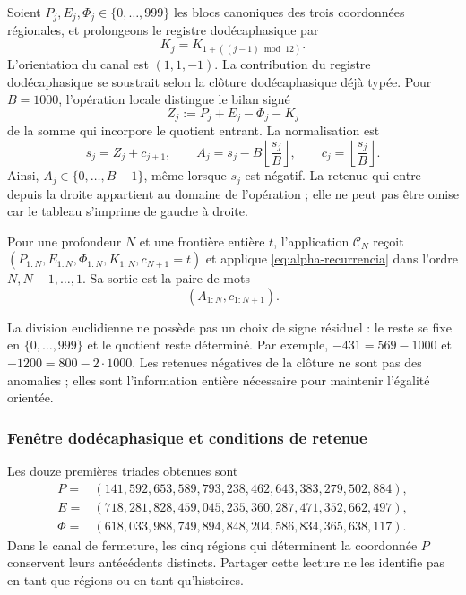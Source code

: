 Soient \(P_j,E_j,\Phi_j\in\{0,\ldots,999\}\) les blocs canoniques des
trois coordonnées régionales, et prolongeons le registre dodécaphasique par
\[
 K_j=K_{1+((j-1)\bmod12)}.
\]
L'orientation du canal est \((1,1,-1)\). La contribution du registre dodécaphasique se soustrait selon la clôture dodécaphasique déjà typée. Pour \(B=1000\), l'opération locale distingue le bilan signé
\[
 Z_j:=P_j+E_j-\Phi_j-K_j
\]
de la somme qui incorpore le quotient entrant. La normalisation est
\begin{equation}
 s_j=Z_j+c_{j+1},\qquad
 A_j=s_j-B\left\lfloor\frac{s_j}{B}\right\rfloor,
 \qquad c_j=\left\lfloor\frac{s_j}{B}\right\rfloor.
 \label{eq:alpha-recurrencia}
\end{equation}
Ainsi, \(A_j\in\{0,\ldots,B-1\}\), même lorsque \(s_j\) est
négatif. La retenue qui entre depuis la droite appartient au domaine de
l'opération ; elle ne peut pas être omise car le tableau s'imprime de gauche
à droite.

\begin{definition}
\label{def:alpha-finita}
Pour une profondeur \(N\) et une frontière entière \(t\), l'application
\(\mathcal C_N\) reçoit
\((P_{1:N},E_{1:N},\Phi_{1:N},K_{1:N},c_{N+1}=t)\) et applique
\eqref{eq:alpha-recurrencia} dans l'ordre \(N,N-1,\ldots,1\). Sa sortie
est la paire de mots
\[
 (A_{1:N},c_{1:N+1}).
\]
\end{definition}

La division euclidienne ne possède pas un choix de signe résiduel : le reste se
fixe en \(\{0,\ldots,999\}\) et le quotient reste déterminé. Par
exemple, \(-431=569-1000\) et \(-1200=800-2\cdot1000\). Les
retenues négatives de la clôture ne sont pas des anomalies ; elles sont l'information
entière nécessaire pour maintenir l'égalité orientée.

\subsubsection{Fenêtre dodécaphasique et conditions de retenue}
\label{subsec:alpha-ventana}

Les douze premières triades obtenues sont
\begin{align*}
 P={}&(141,592,653,589,793,238,462,643,383,279,502,884),\\
 E={}&(718,281,828,459,045,235,360,287,471,352,662,497),\\
 \Phi={}&(618,033,988,749,894,848,204,586,834,365,638,117).
\end{align*}
Dans le canal de fermeture, les cinq régions qui déterminent la coordonnée \(P\) conservent leurs antécédents distincts. Partager cette lecture ne les identifie pas en tant que régions ou en tant qu'histoires.

